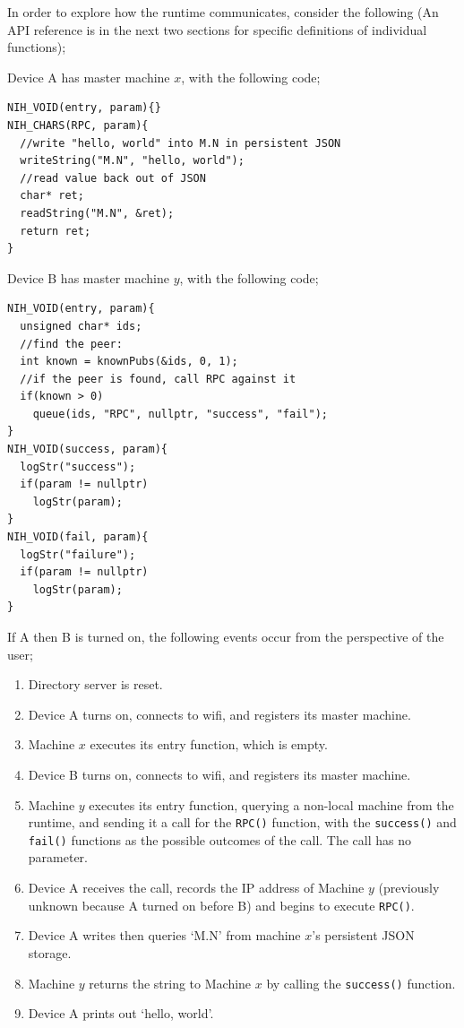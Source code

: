 \documentclass{article}
\begin{document}
In order to explore how the runtime communicates, consider the following (An API reference is in the next two sections for specific definitions of individual functions);

Device A has master machine \( x \), with the following code;
\begin{tcolorbox}[colback=white,grow to left by=2.5mm,grow to right by=2.5mm,left*=0mm,right*=0mm,sharp corners]
\begin{verbatim}
NIH_VOID(entry, param){}
NIH_CHARS(RPC, param){
  //write "hello, world" into M.N in persistent JSON
  writeString("M.N", "hello, world");
  //read value back out of JSON
  char* ret;
  readString("M.N", &ret);
  return ret;
}
\end{verbatim}
\end{tcolorbox}


Device B has master machine \( y \), with the following code;
\begin{tcolorbox}[colback=white,grow to left by=2.5mm,grow to right by=2.5mm,left*=0mm,right*=0mm,sharp corners]
\begin{verbatim}
NIH_VOID(entry, param){
  unsigned char* ids;
  //find the peer:
  int known = knownPubs(&ids, 0, 1);
  //if the peer is found, call RPC against it
  if(known > 0)
    queue(ids, "RPC", nullptr, "success", "fail");
}
NIH_VOID(success, param){
  logStr("success");
  if(param != nullptr)
    logStr(param);
}
NIH_VOID(fail, param){
  logStr("failure");
  if(param != nullptr)
    logStr(param);
}
\end{verbatim}
\end{tcolorbox}

If A then B is turned on, the following events occur from the perspective of the user;

\begin{enumerate}
\item Directory server is reset.
\item Device A turns on, connects to wifi, and registers its master machine.
\item Machine \( x \) executes its entry function, which is empty.
\item Device B turns on, connects to wifi, and registers its master machine.
\item Machine \( y \) executes its entry function, querying a non-local machine from the runtime, and sending it a call for the \texttt{RPC()} function, with the \texttt{success()} and \texttt{fail()} functions as the possible outcomes of the call. The call has no parameter.
\item Device A receives the call, records the IP address of Machine \( y \) (previously unknown because A turned on before B) and begins to execute \texttt{RPC()}.
\item Device A writes then queries \lq M.N' from machine \( x \)'s persistent JSON storage.
\item Machine \( y \) returns the string to Machine \( x \) by calling the \texttt{success()} function.
\item Device A prints out \lq hello, world'.
\end{enumerate}
\end{document}

